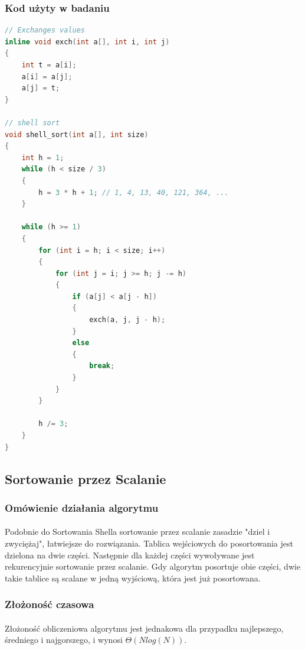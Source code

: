 \documentclass{article}
\begin{document}
\subsubsection{Kod użyty w badaniu}
\begin{lstlisting}[language=C++]
// Exchanges values
inline void exch(int a[], int i, int j)
{
	int t = a[i];
	a[i] = a[j];
	a[j] = t;
}

// shell sort
void shell_sort(int a[], int size)
{
	int h = 1;
	while (h < size / 3)
	{
		h = 3 * h + 1; // 1, 4, 13, 40, 121, 364, ...
	}

	while (h >= 1)
	{
		for (int i = h; i < size; i++)
		{
			for (int j = i; j >= h; j -= h)
			{
				if (a[j] < a[j - h])
				{
					exch(a, j, j - h);
				}
				else
				{
					break;
				}
			}
		}

		h /= 3;
	}
}
\end{lstlisting}

\subsection{Sortowanie przez Scalanie}

\subsubsection{Omówienie działania algorytmu}
\paragraph{} Podobnie do Sortowania Shella sortowanie przez scalanie zasadzie "dziel i zwyciężaj", łatwiejsze do rozwiązania. Tablica wejściowych do posortowania jest dzielona na dwie części. Następnie dla każdej części wywoływane jest rekurencyjnie sortowanie przez scalanie. Gdy algorytm posortuje obie części, dwie takie tablice są scalane w jedną wyjściową, która jest już posortowana.

\subsubsection{Złożoność czasowa}
\paragraph{}Złożoność obliczeniowa algorytmu jest jednakowa dla przypadku najlepszego, średniego i najgorszego, i wynosi ${\Theta(Nlog(N))}$.
\end{document}

